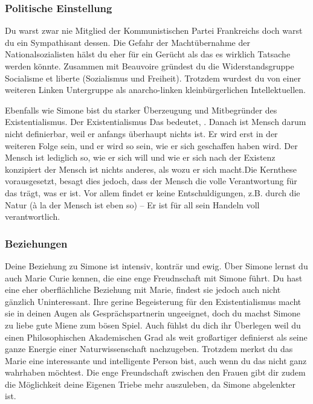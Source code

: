 \documentclass[12pt, a4paper, openany]{report}
\begin{document}
\subsubsection{Politische Einstellung}
Du warst zwar nie Mitglied der Kommunistischen Partei Frankreichs doch warst du ein Sympathisant dessen. Die Gefahr der Machtübernahme der Nationalsozialisten hälst du eher für ein Gerücht als das es wirklich Tatsache werden könnte. Zusammen mit Beauvoire gründest du die Widerstandsgruppe Socialisme et liberte (Sozialismus und Freiheit). Trotzdem wurdest du von einer weiteren Linken Untergruppe als anarcho-linken kleinbürgerlichen Intellektuellen. 

Ebenfalls wie Simone bist du starker Überzeugung und Mitbegründer des Existentialismus. Der Existentialismus  Das bedeutet, . Danach ist Mensch darum nicht definierbar, weil er anfangs überhaupt nichts ist. Er wird erst in der weiteren Folge sein, und er wird so sein, wie er sich geschaffen haben wird. Der Mensch ist lediglich so, wie er sich will und wie er sich nach der Existenz konzipiert der Mensch ist nichts anderes, als wozu er sich macht.Die  Kernthese vorausgesetzt, besagt dies jedoch, dass der Mensch die volle Verantwortung für das trägt, was er ist. Vor allem findet er keine Entschuldigungen, z.B. durch die Natur (à la der Mensch ist eben so) – Er ist für all sein Handeln voll verantwortlich. 

\subsubsection{Beziehungen}
Deine Beziehung zu Simone ist intensiv, konträr und ewig. 
Über Simone lernst du auch Marie Curie kennen, die eine enge Freudnschaft mit Simone führt. Du hast eine eher oberflächliche Beziehung mit Marie, findest sie jedoch auch nicht gänzlich Uninteressant. Ihre gerine Begeisterung für den Existentialismus macht sie in deinen Augen als Gesprächspartnerin ungeeignet, doch du machst Simone zu liebe gute Miene zum bösen Spiel. Auch fühlst du dich ihr Überlegen weil du einen Philosophischen Akademischen Grad als weit großartiger definierst als seine ganze Energie einer Naturwissenschaft nachzugeben. Trotzdem merkst du das Marie eine interessante und intelligente Person bist, auch wenn du das nicht ganz wahrhaben möchtest. Die enge Freundschaft zwischen den Frauen gibt dir zudem die Möglichkeit deine Eigenen Triebe mehr auszuleben, da Simone abgelenkter ist. 
\end{document}
